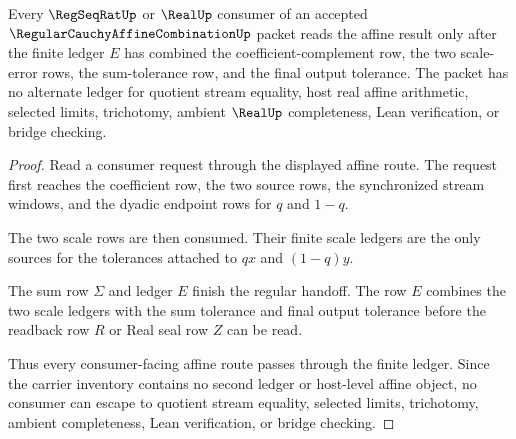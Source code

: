 \begin{theorem}
\label{thm:regular-cauchy-affine-combination-ledger}
Every $\RegSeqRatUp$ or $\RealUp$ consumer of an accepted $\RegularCauchyAffineCombinationUp$ packet reads the affine result only after the finite ledger $E$ has combined the coefficient-complement row, the two scale-error rows, the sum-tolerance row, and the final output tolerance. The packet has no alternate ledger for quotient stream equality, host real affine arithmetic, selected limits, trichotomy, ambient $\RealUp$ completeness, Lean verification, or bridge checking.
\end{theorem}
\begin{proof}
Read a consumer request through the displayed affine route. The request first reaches the coefficient row, the two source rows, the synchronized stream windows, and the dyadic endpoint rows for $q$ and $1-q$.

The two scale rows are then consumed. Their finite scale ledgers are the only sources for the tolerances attached to $q x$ and $(1-q)y$.

The sum row $\Sigma$ and ledger $E$ finish the regular handoff. The row $E$ combines the two scale ledgers with the sum tolerance and final output tolerance before the readback row $R$ or Real seal row $Z$ can be read.

Thus every consumer-facing affine route passes through the finite ledger. Since the carrier inventory contains no second ledger or host-level affine object, no consumer can escape to quotient stream equality, selected limits, trichotomy, ambient completeness, Lean verification, or bridge checking.
\end{proof}

